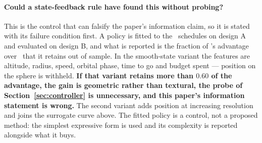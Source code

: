 \paragraph{Could a state-feedback rule have found this without probing?} This
is the control that can falsify the paper's information claim, so it is stated
with its failure condition first. A policy is fitted to the \Asign\ schedules
on design A and evaluated on design B, and what is reported is the fraction of
\Asign's advantage over \Fop\ that it retains out of sample. In the smooth-state
variant the features are altitude, radius, speed, orbital phase, time to go and
budget spent --- position on the sphere is withheld. \textbf{If that variant
retains more than $0.60$ of the advantage, the gain is geometric rather than
textural, the probe of Section~\ref{sec:controller} is unnecessary, and this
paper's information statement is wrong.}  The second variant adds position at increasing
resolution and joins the surrogate curve above. The fitted policy is a control,
not a proposed method: the simplest expressive form is used and its complexity
is reported alongside what it buys.
